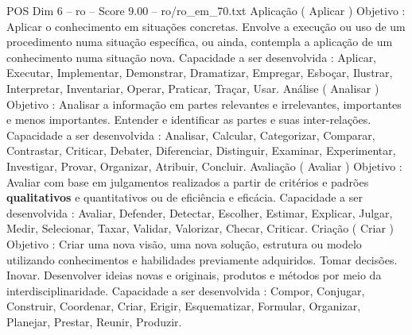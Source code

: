 \begin{textsample}{POS Dim 6 – ro – Score 9.00 – ro/ro\_em\_70.txt}
Aplicação ( Aplicar ) Objetivo : Aplicar o conhecimento em situações concretas.
Envolve a execução ou uso de um procedimento numa situação específica, ou ainda, contempla a aplicação de um conhecimento numa situação nova.
Capacidade a ser desenvolvida : Aplicar, Executar, Implementar, Demonstrar, Dramatizar, Empregar, Esboçar, Ilustrar, Interpretar, Inventariar, Operar, Praticar, Traçar, Usar.
Análise ( Analisar ) Objetivo : Analisar a informação em partes relevantes e irrelevantes, importantes e menos importantes.
Entender e identificar as partes e suas inter-relações.
Capacidade a ser desenvolvida : Analisar, Calcular, Categorizar, Comparar, Contrastar, Criticar, Debater, Diferenciar, Distinguir, Examinar, Experimentar, Investigar, Provar, Organizar, Atribuir, Concluir.
Avaliação ( Avaliar ) Objetivo : Avaliar com base em julgamentos realizados a partir de critérios e padrões \textbf{qualitativos} e quantitativos ou de eficiência e eficácia.
Capacidade a ser desenvolvida : Avaliar, Defender, Detectar, Escolher, Estimar, Explicar, Julgar, Medir, Selecionar, Taxar, Validar, Valorizar, Checar, Criticar.
Criação ( Criar ) Objetivo : Criar uma nova visão, uma nova solução, estrutura ou modelo utilizando conhecimentos e habilidades previamente adquiridos.
Tomar decisões.
Inovar.
Desenvolver ideias novas e originais, produtos e métodos por meio da interdisciplinaridade.
Capacidade a ser desenvolvida : Compor, Conjugar, Construir, Coordenar, Criar, Erigir, Esquematizar, Formular, Organizar, Planejar, Prestar, Reunir, Produzir.

\end{textsample}
